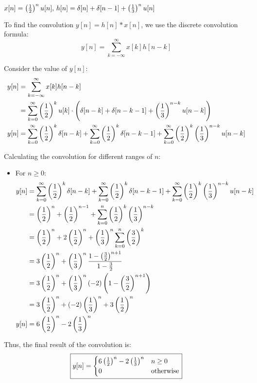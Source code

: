 \documentclass[a4paper, 10pt]{article}
\begin{document}
\begin{tosubmit}    
\begin{subproblems}[start=3]
    \item \( x[n] = \left( \frac{1}{2} \right)^n u[n],\, h[n] = \delta[n] +\delta[n-1] +  \left( \frac{1}{3} \right)^n u[n] \)
\end{subproblems}

\par\noindent\submitsolution
To find the convolution \( y[n] = h[n] * x[n] \), we use the discrete convolution formula:
\[ y[n] = \sum_{k=-\infty}^{\infty} x[k] h[n - k] \]

Consider the value of \( y[n] \):
\begin{align*}
    y[n] &= \sum_{k=-\infty}^{\infty} x[k] h[n - k] \\
    &= \sum_{k=0}^{\infty} \left( \frac{1}{2} \right)^k u[k] \cdot \left( \delta[n - k] + \delta[n - k - 1] + \left( \frac{1}{3} \right)^{n - k} u[n - k] \right) \\
    y[n] &= \sum_{k=0}^{\infty} \left( \frac{1}{2} \right)^k \delta[n - k] + \sum_{k=0}^{\infty} \left( \frac{1}{2} \right)^k \delta[n - k - 1] + \sum_{k=0}^{\infty} \left( \frac{1}{2} \right)^k \left( \frac{1}{3} \right)^{n - k} u[n - k] \\
\end{align*}

Calculating the convolution for different ranges of \( n \):
\begin{itemize}
    \item For \( n \geq 0 \):
    \begin{align*}
        y[n] &= \sum_{k=0}^{\infty} \left( \frac{1}{2} \right)^k \delta[n - k] + \sum_{k=0}^{\infty} \left( \frac{1}{2} \right)^k \delta[n - k - 1] + \sum_{k=0}^{\infty} \left( \frac{1}{2} \right)^k \left( \frac{1}{3} \right)^{n - k} u[n - k] \\
        &= \left( \frac{1}{2} \right)^n + \left( \frac{1}{2} \right)^{n-1} + \sum_{k=0}^{n} \left( \frac{1}{2} \right)^k \left( \frac{1}{3} \right)^{n - k} \\
        &= \left( \frac{1}{2} \right)^n + 2 \left( \frac{1}{2} \right)^n + \left( \frac{1}{3} \right)^n \sum_{k=0}^{n} \left( \frac{3}{2} \right)^k \\
        &= 3 \left( \frac{1}{2} \right)^n + \left( \frac{1}{3} \right)^n \frac{1 - \left( \frac{3}{2} \right)^{n+1}}{1 - \frac{3}{2}} \\
        &= 3 \left( \frac{1}{2} \right)^n + \left( \frac{1}{3} \right)^n (-2)\left( 1 - \left( \frac{3}{2} \right)^{n+1}\right) \\
        &= 3 \left( \frac{1}{2} \right)^n + (-2) \left( \frac{1}{3} \right)^{n} + 3 \left( \frac{1}{2} \right)^{n} \\
        y[n] &= 6 \left( \frac{1}{2} \right)^n - 2 \left( \frac{1}{3} \right)^{n} \\
    \end{align*}
\end{itemize}

Thus, the final result of the convolution is:
\[ \boxed{
y[n] = \begin{cases}
6 \left( \frac{1}{2} \right)^n - 2 \left( \frac{1}{3} \right)^n & n \geq 0 \\
0 & \text{otherwise}
\end{cases}
} \]
\end{tosubmit}
\end{document}
